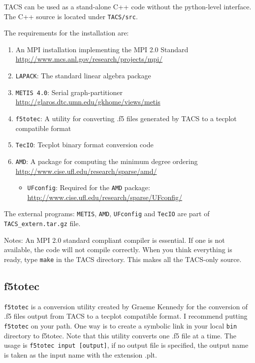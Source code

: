 \documentclass{article}
\begin{document}
TACS can be used as a stand-alone C++ code without the python-level
interface. The C++ source is located under \texttt{TACS/src}. 

The requirements for the installation are:
%
\begin{enumerate}
\item An MPI installation implementing the MPI 2.0 Standard
  \url{http://www.mcs.anl.gov/research/projects/mpi/}
\item \texttt{LAPACK}: The standard linear algebra package
\item \texttt{METIS 4.0}: Serial graph-partitioner
  \url{http://glaros.dtc.umn.edu/gkhome/views/metis}
\item \texttt{f5totec}: A utility for converting .f5 files generated
  by TACS to a tecplot compatible format
\item \texttt{TecIO}: Tecplot binary format conversion code
\item \texttt{AMD}: A package for computing the minimum degree
  ordering \url{http://www.cise.ufl.edu/research/sparse/amd/}
  \begin{itemize}
  \item \texttt{UFconfig}: Required for the \texttt{AMD} package:
    \url{http://www.cise.ufl.edu/research/sparse/UFconfig/}
  \end{itemize}
\end{enumerate}

The external programs: \texttt{METIS}, \texttt{AMD}, \texttt{UFconfig}
and \texttt{TecIO} are part of \texttt{TACS\_extern.tar.gz} file.

Notes: An MPI 2.0 standard compliant compiler is essential. If one is
not available, the code will not compile correctly. When you
think everything is ready, type \texttt{make} in the TACS
directory. This makes all the TACS-only source.

\subsection{f5totec}

\texttt{f5totec} is a conversion utility created by Graeme Kennedy for
the conversion of .f5 files output from TACS to a tecplot compatible
format. I recommend putting \texttt{f5totec} on your path. One way is
to create a symbolic link in your local \texttt{bin} directory to
f5totec. Note that this utility converts one .f5 file at a time. The
usage is \texttt{f5totec input [output]}, if no output file is
specified, the output name is taken as the input name with the
extension .plt.
\end{document}
